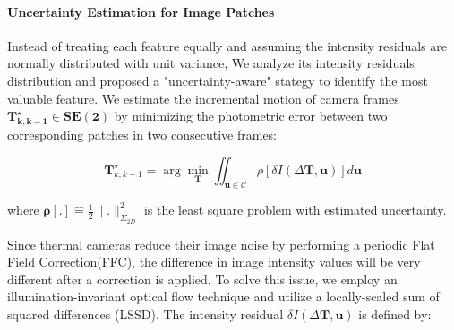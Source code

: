 \paragraph{\textbf{Uncertainty Estimation for Image Patches}}
Instead of treating each feature equally and assuming the intensity residuals are normally distributed with unit variance, 
We analyze its intensity residuals distribution and proposed a "uncertainty-aware" stategy to identify the most valuable feature. 
We estimate the incremental motion of camera frames  $\bm { \mathbf{T}_{k, k-1}^{\star} \in SE(2)}$ by minimizing the photometric error between two corresponding patches in two consecutive frames:

\begin{equation}
\mathbf{T}_{k, k-1}^{\star}=\arg \min _{\mathbf{T}} \iint_{\mathbf{u} \in {\mathcal{C}}} \rho[\delta I( \Delta \mathbf{T}, \mathbf{u})] d \mathbf{u}   
\label{eq:2}
\end{equation}

where $\mathbf{\rho}[.] \hat{=} \frac{1}{2}\|.\|_{\Sigma_{2D}}^2$ is the least square problem with estimated uncertainty. 


Since thermal cameras reduce their image noise by performing a periodic Flat Field Correction(FFC),  the difference in image intensity values will be very different after a correction is applied. To solve this issue, we employ an illumination-invariant optical flow technique and utilize a locally-scaled sum of squared differences (LSSD)\cite{roma2002comparative}. The intensity residual $\delta I( \Delta \mathbf{T}, \mathbf{u})$ is defined by: 





 









